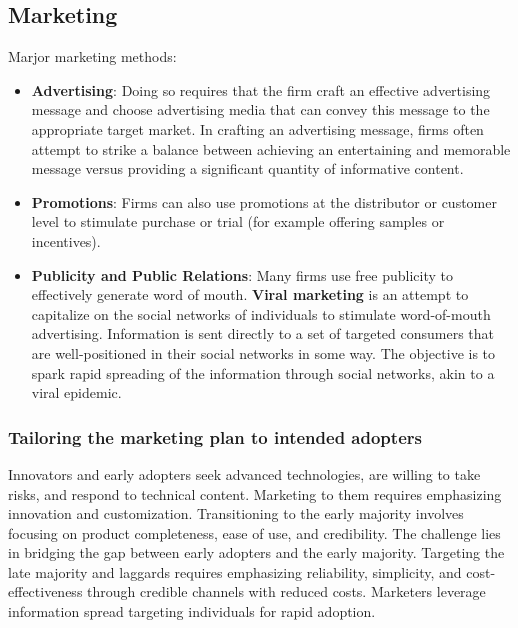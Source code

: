 \documentclass[12pt]{article}
\begin{document}
\subsection{Marketing}
Marjor marketing methods:
\begin{itemize}
    \item \textbf{Advertising}: Doing so requires that the firm craft an effective advertising message and choose advertising media that can convey this message to the appropriate target market.
    In crafting an advertising message, firms often attempt to strike a balance between
    achieving an entertaining and memorable message versus providing a significant quantity of informative content.
    \item \textbf{Promotions}: Firms can also use promotions at the distributor or customer level to stimulate purchase or trial (for example offering samples or incentives).
    \item \textbf{Publicity and Public Relations}: Many firms use free publicity to effectively generate word of mouth. 
    \textbf{Viral marketing} is an attempt to capitalize on the social networks of individuals to stimulate word-of-mouth advertising. Information is sent directly to a set of targeted consumers that are well-positioned in their social networks in some way. The objective is to spark rapid spreading of the information through social networks, akin to a viral epidemic.
\end{itemize}

\subsubsection{Tailoring the marketing plan to intended adopters}
Innovators and early adopters seek advanced technologies, are willing to take risks, and respond to technical content. Marketing to them requires emphasizing innovation and customization. Transitioning to the early majority involves focusing on product completeness, 
ease of use, and credibility. The challenge lies in bridging the gap between early adopters and the early majority. Targeting the late majority and laggards requires emphasizing reliability, simplicity, and cost-effectiveness through credible channels with reduced costs. 
Marketers leverage information spread targeting individuals for rapid adoption.
\end{document}
